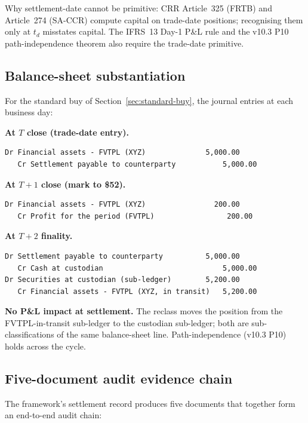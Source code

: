 \documentclass[11pt,a4paper]{article}
\begin{document}
Why settlement-date cannot be primitive: CRR Article~325 (FRTB) and Article~274 (SA-CCR) compute capital on trade-date positions; recognising them only at $t_d$ misstates capital. The IFRS~13 Day-1 P\&L rule and the v10.3 P10 path-independence theorem also require the trade-date primitive.

\subsection{Balance-sheet substantiation}
\label{sec:accounting-bs}

For the standard buy of Section~\ref{sec:standard-buy}, the journal entries at each business day:

\textbf{At $T$ close (trade-date entry).}
\begin{lstlisting}
Dr Financial assets - FVTPL (XYZ)              5,000.00
   Cr Settlement payable to counterparty           5,000.00
\end{lstlisting}

\textbf{At $T+1$ close (mark to \$52).}
\begin{lstlisting}
Dr Financial assets - FVTPL (XYZ)                200.00
   Cr Profit for the period (FVTPL)                 200.00
\end{lstlisting}

\textbf{At $T+2$ finality.}
\begin{lstlisting}
Dr Settlement payable to counterparty          5,000.00
   Cr Cash at custodian                            5,000.00
Dr Securities at custodian (sub-ledger)        5,200.00
   Cr Financial assets - FVTPL (XYZ, in transit)   5,200.00
\end{lstlisting}

\textbf{No P\&L impact at settlement.} The reclass moves the position from the FVTPL-in-transit sub-ledger to the custodian sub-ledger; both are sub-classifications of the same balance-sheet line. Path-independence (v10.3 P10) holds across the cycle.

\subsection{Five-document audit evidence chain}
\label{sec:accounting-audit}

The framework's settlement record produces five documents that together form an end-to-end audit chain:
\end{document}
